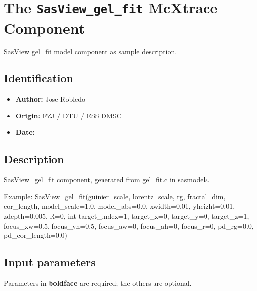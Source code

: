 \section{The \texttt{SasView\_gel\_fit} McXtrace Component}
SasView gel\_fit model component as sample description.

\subsection*{Identification}
\begin{itemize}
  \item \textbf{Author:} Jose Robledo
  \item \textbf{Origin:} FZJ / DTU / ESS DMSC
  \item \textbf{Date:} 
\end{itemize}

\subsection*{Description}
SasView\_gel\_fit component, generated from gel\_fit.c in sasmodels.

Example: SasView\_gel\_fit(guinier\_scale, lorentz\_scale, rg, fractal\_dim, cor\_length, model\_scale=1.0, model\_abs=0.0, xwidth=0.01, yheight=0.01, zdepth=0.005, R=0, int target\_index=1, target\_x=0, target\_y=0, target\_z=1, focus\_xw=0.5, focus\_yh=0.5, focus\_aw=0, focus\_ah=0, focus\_r=0, pd\_rg=0.0, pd\_cor\_length=0.0)

\subsection*{Input parameters}
Parameters in \textbf{boldface} are required; the others are optional.

